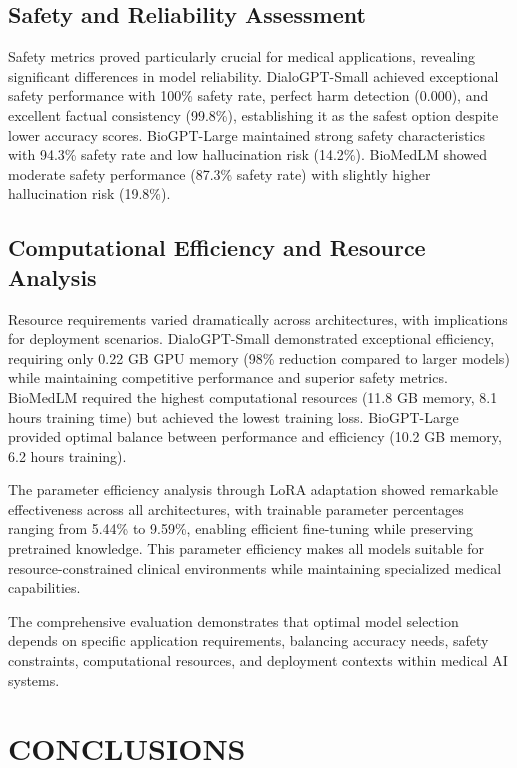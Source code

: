\documentclass[conference]{IEEEtran}
\begin{document}
\subsection{Safety and Reliability Assessment}

Safety metrics proved particularly crucial for medical applications, revealing significant differences in model reliability. DialoGPT-Small achieved exceptional safety performance with 100\% safety rate, perfect harm detection (0.000), and excellent factual consistency (99.8\%), establishing it as the safest option despite lower accuracy scores. BioGPT-Large maintained strong safety characteristics with 94.3\% safety rate and low hallucination risk (14.2\%). BioMedLM showed moderate safety performance (87.3\% safety rate) with slightly higher hallucination risk (19.8\%).

\subsection{Computational Efficiency and Resource Analysis}

Resource requirements varied dramatically across architectures, with implications for deployment scenarios. DialoGPT-Small demonstrated exceptional efficiency, requiring only 0.22 GB GPU memory (98\% reduction compared to larger models) while maintaining competitive performance and superior safety metrics. BioMedLM required the highest computational resources (11.8 GB memory, 8.1 hours training time) but achieved the lowest training loss. BioGPT-Large provided optimal balance between performance and efficiency (10.2 GB memory, 6.2 hours training).

The parameter efficiency analysis through LoRA adaptation showed remarkable effectiveness across all architectures, with trainable parameter percentages ranging from 5.44\% to 9.59\%, enabling efficient fine-tuning while preserving pretrained knowledge. This parameter efficiency makes all models suitable for resource-constrained clinical environments while maintaining specialized medical capabilities.

The comprehensive evaluation demonstrates that optimal model selection depends on specific application requirements, balancing accuracy needs, safety constraints, computational resources, and deployment contexts within medical AI systems.

\section{CONCLUSIONS}
\end{document}
